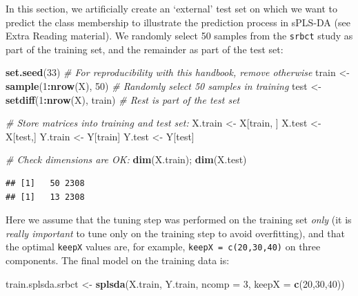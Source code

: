 \documentclass[]{book}
\newenvironment{Shaded}{\begin{snugshade}}{\end{snugshade}}
\newcommand{\KeywordTok}[1]{\textcolor[rgb]{0.13,0.29,0.53}{\textbf{#1}}}
\newcommand{\DataTypeTok}[1]{\textcolor[rgb]{0.13,0.29,0.53}{#1}}
\newcommand{\DecValTok}[1]{\textcolor[rgb]{0.00,0.00,0.81}{#1}}
\newcommand{\StringTok}[1]{\textcolor[rgb]{0.31,0.60,0.02}{#1}}
\newcommand{\CommentTok}[1]{\textcolor[rgb]{0.56,0.35,0.01}{\textit{#1}}}
\newcommand{\OperatorTok}[1]{\textcolor[rgb]{0.81,0.36,0.00}{\textbf{#1}}}
\newcommand{\NormalTok}[1]{#1}
\begin{document}
In this section, we artificially create an `external' test set on which
we want to predict the class membership to illustrate the prediction
process in sPLS-DA (see Extra Reading material). We randomly select 50
samples from the \texttt{srbct} study as part of the training set, and
the remainder as part of the test set:

\begin{Shaded}
\begin{Highlighting}[]
\KeywordTok{set.seed}\NormalTok{(}\DecValTok{33}\NormalTok{) }\CommentTok{# For reproducibility with this handbook, remove otherwise}
\NormalTok{train <-}\StringTok{ }\KeywordTok{sample}\NormalTok{(}\DecValTok{1}\OperatorTok{:}\KeywordTok{nrow}\NormalTok{(X), }\DecValTok{50}\NormalTok{)    }\CommentTok{# Randomly select 50 samples in training}
\NormalTok{test <-}\StringTok{ }\KeywordTok{setdiff}\NormalTok{(}\DecValTok{1}\OperatorTok{:}\KeywordTok{nrow}\NormalTok{(X), train) }\CommentTok{# Rest is part of the test set}

\CommentTok{# Store matrices into training and test set:}
\NormalTok{X.train <-}\StringTok{ }\NormalTok{X[train, ]}
\NormalTok{X.test <-}\StringTok{ }\NormalTok{X[test,]}
\NormalTok{Y.train <-}\StringTok{ }\NormalTok{Y[train]}
\NormalTok{Y.test <-}\StringTok{ }\NormalTok{Y[test]}

\CommentTok{# Check dimensions are OK:}
\KeywordTok{dim}\NormalTok{(X.train); }\KeywordTok{dim}\NormalTok{(X.test)}
\end{Highlighting}
\end{Shaded}

\begin{verbatim}
## [1]   50 2308
## [1]   13 2308
\end{verbatim}

Here we assume that the tuning step was performed on the training set
\emph{only} (it is \emph{really important} to tune only on the training
step to avoid overfitting), and that the optimal \texttt{keepX} values
are, for example, \texttt{keepX\ =\ c(20,30,40)} on three components.
The final model on the training data is:

\begin{Shaded}
\begin{Highlighting}[]
\NormalTok{train.splsda.srbct <-}\StringTok{ }\KeywordTok{splsda}\NormalTok{(X.train, Y.train, }\DataTypeTok{ncomp =} \DecValTok{3}\NormalTok{, }\DataTypeTok{keepX =} \KeywordTok{c}\NormalTok{(}\DecValTok{20}\NormalTok{,}\DecValTok{30}\NormalTok{,}\DecValTok{40}\NormalTok{))}
\end{Highlighting}
\end{Shaded}
\end{document}
